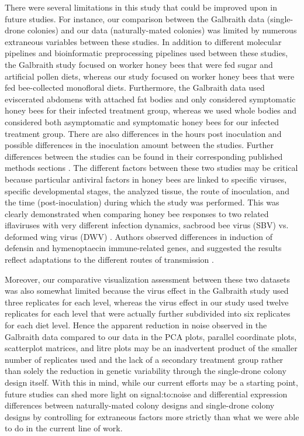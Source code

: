 \documentclass{bmcart}
\begin{document}
\begin{linenumbers}
\begin{doublespacing}
There were several limitations in this study that could be improved upon in future studies. For instance, our comparison between the Galbraith data (single-drone colonies) and our data (naturally-mated colonies) was limited by numerous extraneous variables between these studies. In addition to different molecular pipelines and bioinformatic preprocessing pipelines used between these studies, the Galbraith study focused on worker honey bees that were fed sugar and artificial pollen diets, whereas our study focused on worker honey bees that were fed bee-collected monofloral diets. Furthermore, the Galbraith data used eviscerated abdomens with attached fat bodies and only considered symptomatic honey bees for their infected treatment group, whereas we used whole bodies and considered both asymptomatic and symptomatic honey bees for our infected treatment group. There are also differences in the hours post inoculation and possible differences in the inoculation amount between the studies. Further differences between the studies can be found in their corresponding published methods sections \cite{adamInt, galbraith}. The different factors between these two studies may be critical because particular antiviral factors in honey bees are linked to specific viruses, specific developmental stages, the analyzed tissue, the route of inoculation, and the time (post-inoculation) during which the study was performed. This was clearly demonstrated when comparing honey bee responses to two related iflaviruses with very different infection dynamics, sacbrood bee virus (SBV) vs. deformed wing virus (DWV) \cite{Ryabov}. Authors observed differences in induction of defensin and hymenoptaecin immune-related genes, and suggested the results reflect adaptations to the different routes of transmission \cite{Ryabov}. 

Moreover, our comparative visualization assessment between these two datasets was also somewhat limited because the virus effect in the Galbraith study used three replicates for each level, whereas the virus effect in our study used twelve replicates for each level that were actually further subdivided into six replicates for each diet level. Hence the apparent reduction in noise observed in the Galbraith data compared to our data in the PCA plots, parallel coordinate plots, scatterplot matrices, and litre plots may be an inadvertent product of the smaller number of replicates used and the lack of a secondary treatment group rather than solely the reduction in genetic variability through the single-drone colony design itself. With this in mind, while our current efforts may be a starting point, future studies can shed more light on signal:to:noise and differential expression differences between naturally-mated colony designs and single-drone colony designs by controlling for extraneous factors more strictly than what we were able to do in the current line of work. 


\end{doublespacing}
\end{linenumbers}
\end{document}
